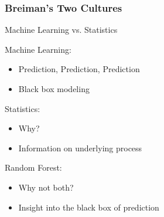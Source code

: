\documentclass[xcolor=svgnames]{beamer}\usepackage[]{graphicx}\usepackage[]{color}
\begin{document}
\begin{frame}
\frametitle{Breiman's Two Cultures}

Machine Learning vs. Statistics

Machine Learning:

\begin{itemize}
\item Prediction, Prediction, Prediction
\item Black box modeling
\end{itemize}

Statistics:
\begin{itemize}
\item Why?
\item Information on underlying process
\end{itemize}

Random Forest:

\begin{itemize}
\item Why not both?
\item Insight into the black box of prediction
\end{itemize}
\end{frame}
\end{document}
